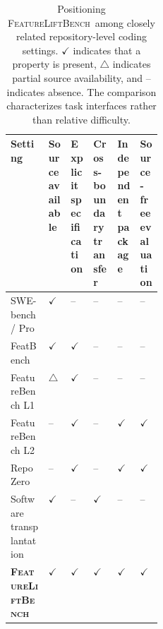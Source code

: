 \documentclass[acmsmall,screen,review,anonymous]{acmart}
\newcommand{\flb}{\textsc{FeatureLiftBench}\xspace}
\begin{document}
\begin{table}[H]
  \caption{Positioning \flb\ among closely related repository-level coding
  settings. \(\checkmark\) indicates that a property is present,
  \(\triangle\) indicates partial source availability, and -- indicates
  absence. The comparison characterizes task interfaces rather than relative
  difficulty.}
  \label{tab:setting-comparison}
  \centering
  \footnotesize
  \setlength{\tabcolsep}{3.2pt}
  \renewcommand{\arraystretch}{1.10}
  \begin{tabularx}{\linewidth}{
      @{}
      >{\raggedright\arraybackslash}p{0.25\linewidth}
      *{5}{>{\centering\arraybackslash}X}
      @{}
    }
    \toprule
    Setting &
    \shortstack{Source\\available} &
    \shortstack{Explicit\\specification} &
    \shortstack{Cross-boundary\\transfer} &
    \shortstack{Independent\\package} &
    \shortstack{Source-free\\evaluation} \\
    \midrule

    SWE-bench / Pro
      & \(\checkmark\) & -- & -- & -- & -- \\

    FeatBench
      & \(\checkmark\) & \(\checkmark\) & -- & -- & -- \\

    FeatureBench L1
      & \(\triangle\) & \(\checkmark\) & -- & -- & -- \\

    FeatureBench L2
      & -- & \(\checkmark\) & -- & \(\checkmark\) & \(\checkmark\) \\

    RepoZero
      & -- & \(\checkmark\) & -- & \(\checkmark\) & \(\checkmark\) \\

    Software transplantation
      & \(\checkmark\) & -- & \(\checkmark\) & -- & -- \\

    \midrule
    \textbf{\flb}
      & \(\checkmark\)
      & \(\checkmark\)
      & \(\checkmark\)
      & \(\checkmark\)
      & \(\checkmark\) \\

    \bottomrule
  \end{tabularx}
\end{table}
\end{document}
